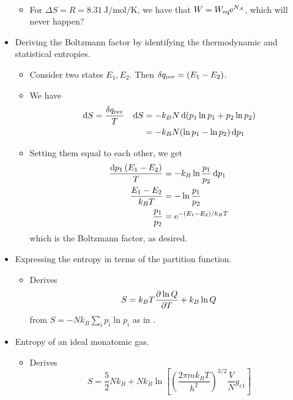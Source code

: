 \documentclass[../notes.tex]{subfiles}
\begin{document}
\begin{itemize}
\begin{itemize}
\begin{align*}
        \end{align*}
        \item For $\Delta S=R=\SI{8.31}{\joule\per\mole\per\kelvin}$, we have that $W=W_\text{eq}\e[N_A]$, which will never happen?
    \end{itemize}
    \item Deriving the Boltzmann factor by identifying the thermodynamic and statistical entropies.
    \begin{itemize}
        \item Consider two states $E_1,E_2$. Then $\var{q_\text{rev}}=(E_1-E_2)$.
        \item We have
        \begin{align*}
            \dd{S} &= \frac{\var{q_\text{rev}}}{T}&
                \dd{S} &= -k_BN\dd{(p_1\ln p_1+p_2\ln p_2)}\\
            &&
                &= -k_BN(\ln p_1-\ln p_2)\dd{p_1}
        \end{align*}
        \item Setting them equal to each other, we get
        \begin{align*}
            \frac{\dd{p_1}(E_1-E_2)}{T} &= -k_B\ln\frac{p_1}{p_2}\dd{p_1}\\
            \frac{E_1-E_2}{k_BT} &= -\ln\frac{p_1}{p_2}\\
            \frac{p_1}{p_2} &= \e[-(E_1-E_2)/k_BT]
        \end{align*}
        which is the Boltzmann factor, as desired.
    \end{itemize}
    \item Expressing the entropy in terms of the partition function.
    \begin{itemize}
        \item Derives
        \begin{equation*}
            S = k_BT\pdv{\ln Q}{T}+k_B\ln Q
        \end{equation*}
        from $S=-Nk_B\sum_ip_i\ln p_i$ as in \textcite{bib:McQuarrieSimon}.
    \end{itemize}
    \item Entropy of an ideal monatomic gas.
    \begin{itemize}
        \item Derives
        \begin{equation*}
            S = \frac{5}{2}Nk_B+Nk_B\ln\left[ \left( \frac{2\pi mk_BT}{h^2} \right)^{3/2}\frac{V}{N}g_{e1} \right]
        \end{equation*}

\end{itemize}
\end{itemize}
\end{document}
